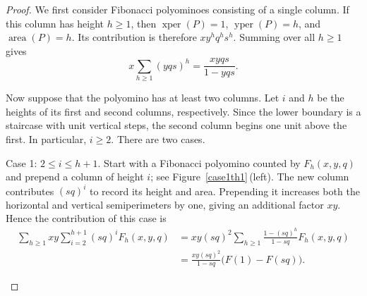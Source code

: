 \documentclass[12pt]{amsart}
\theoremstyle{plain}
\theoremstyle{definition}
\DeclareMathOperator{\yper}{yper}
\DeclareMathOperator{\xper}{xper}
\DeclareMathOperator{\area}{area}
\def\y{\hspace{2.45ex}}  %
\begin{document}
\begin{proof}
We first consider Fibonacci polyominoes consisting of a single column. If this column has height $h\geq 1$, then $\xper(P)=1$, $\yper(P)=h$, and $\area(P)=h$. Its contribution  is therefore $xy^hq^hs^h$. Summing over all $h\geq 1$ gives 
\[x\sum_{h\geq 1}(yqs)^{h}=\frac{xyqs}{1-yqs}.\]

Now suppose that the polyomino has at least two columns. Let $i$ and $h$ be the heights of its first and second columns, respectively. Since the lower boundary is a staircase with unit vertical steps, the second column begins one unit above the first. In particular, $i\geq 2$. There are two cases.


Case 1: $2\leq i\leq h+1$.  Start with a Fibonacci polyomino counted by $F_h(x,y,q)$ and prepend a column of height $i$; see Figure~\ref{case1th1}\,(left). The new column contributes  $(sq)^i$ to record its height and area. Prepending it increases both the horizontal and vertical semiperimeters by one, giving an additional factor  $xy$. Hence the contribution of this case is
\begin{align*}
\sum_{h\geq 1} xy \sum_{i=2}^{h+1} (sq)^{i} F_h(x,y,q)
&= xy (sq)^{2} \sum_{h\geq 1} \frac{1-(sq)^{h}}{1-sq} F_h(x,y,q)\\
&= \frac{xy (sq)^{2}}{1-sq} \big(F(1)-F(sq)\big).
\end{align*}


\begin{figure}[ht!]
\centering
{}
\end{figure}
\end{proof}
\end{document}
